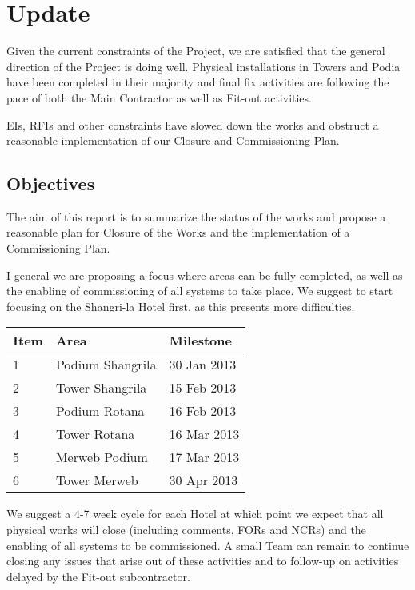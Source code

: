 
\cleardoublepage

\chapter*{Update}

Given the current constraints of the Project, we are satisfied that the general direction of the Project is doing well. Physical installations in Towers and Podia have been completed in their majority and final fix activities are following the pace of both the Main Contractor as well as Fit-out activities. 

EIs, RFIs and other constraints have slowed down the works and obstruct a reasonable implementation of our Closure and Commissioning Plan.

\section*{Objectives}

The aim of this report is to summarize the status of the works
and propose a reasonable plan for Closure of the Works and the implementation of a Commissioning Plan.

I general we are proposing a focus where areas can be fully completed, as well as the enabling of commissioning of all systems to take place. We suggest to start focusing on the
Shangri-la Hotel first, as this presents more difficulties.

\begin{longtable}{lll}
\toprule
Item  &Area   & Milestone \\
\midrule
1     & Podium Shangrila & 30 Jan 2013\\
2     & Tower Shangrila  & 15 Feb 2013\\
3     & Podium Rotana    & 16 Feb 2013\\
4     & Tower Rotana     & 16 Mar 2013\\
5     & Merweb Podium    & 17 Mar 2013\\
6     & Tower Merweb     & 30 Apr 2013\\
\bottomrule
\end{longtable}

We suggest a 4-7 week cycle for each Hotel at which point we expect that all physical works will close (including comments, FORs and NCRs) and the enabling of all systems to be commissioned. A small Team can remain to continue closing any issues that arise out of these activities and to follow-up on activities delayed by the Fit-out subcontractor.

